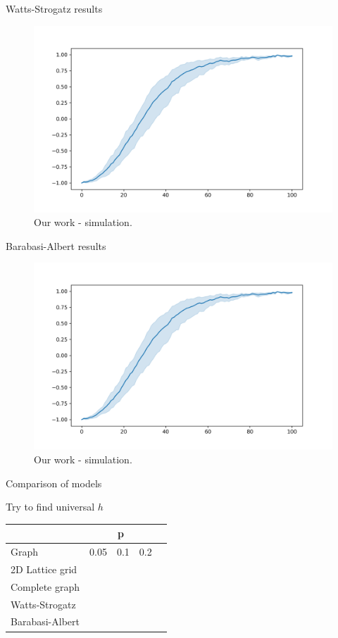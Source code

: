 \documentclass[10pt]{beamer}
\begin{document}
\begin{frame}{Watts-Strogatz results}
	\begin{figure}
		\includegraphics[width=\textwidth]{../results/images/example.png}
		\caption{Our work - simulation.}
	\end{figure}
\end{frame}

\begin{frame}{Barabasi-Albert results}
	\begin{figure}
		\includegraphics[width=\textwidth]{../results/images/example.png}
		\caption{Our work - simulation.}
	\end{figure}
\end{frame}

\begin{frame}{Comparison of models}
	
	Try to find universal $h$
	\begin{table}[]
		\begin{tabular}{l|llll}
			& \multicolumn{3}{c}{p} &  \\
			\hline
			Graph           & 0.05   & 0.1   & 0.2  &  \\
			\hline
			2D Lattice grid &        &       &      &  \\
			Complete graph  &        &       &      &  \\
			Watts-Strogatz  &        &       &      &  \\
			Barabasi-Albert &        &       &      & 
		\end{tabular}
	\end{table}
\end{frame}
\end{document}
